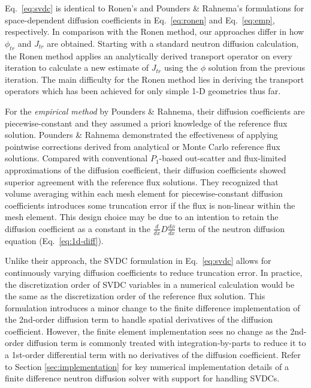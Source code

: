 Eq.\ \ref{eq:svdc} is identical to Ronen's \cite{ronen_accurate_2004} and Pounders \& Rahnema's
\cite{pounders_diffusion_2009} formulations for space-dependent diffusion coefficients in Eq.\
\ref{eq:ronen} and Eq.\ \ref{eq:emp}, respectively. In comparison with
the Ronen method, our approaches differ in how $\phi_{tr}$ and $J_{tr}$ are obtained. Starting with
a standard neutron diffusion calculation, the Ronen method applies an analytically derived
transport operator on every iteration to calculate a new estimate of $J_{tr}$ using the $\phi$
solution from the previous iteration. The main difficulty for the Ronen method lies in deriving the
transport operators which has been achieved for only simple 1-D geometries thus far.

For the \textit{empirical method} by Pounders \& Rahnema, their diffusion coefficients are
piecewise-constant and they assumed a priori knowledge of the reference flux solution.
Pounders \& Rahnema \cite{pounders_diffusion_2009} demonstrated the effectiveness of applying
pointwise corrections derived from analytical or Monte Carlo reference flux solutions. Compared
with conventional $P_1$-based out-scatter and flux-limited approximations of the diffusion
coefficient, their diffusion coefficients showed superior agreement
with the reference flux solutions. They recognized that volume averaging within each mesh element
for piecewise-constant diffusion coefficients introduces some truncation error if the flux is
non-linear within the mesh element. This design choice may be due to an intention to retain the
diffusion coefficient as a constant in the $\frac{d}{dx}D\frac{d\phi}{dx}$ term of the neutron
diffusion equation (Eq.\ \ref{eq:1d-diff}).

Unlike their approach, the \gls{SVDC} formulation in Eq.\ \ref{eq:svdc} allows for continuously
varying diffusion coefficients to reduce truncation error. In practice, the discretization order of
\gls{SVDC} variables in a numerical calculation would be the same as the discretization order of
the reference flux solution. This formulation introduces a minor change to the finite difference
implementation of the 2nd-order diffusion term to handle spatial derivatives of the
diffusion coefficient. However, the finite element implementation sees no change as the 2nd-order
diffusion term is commonly treated with integration-by-parts to reduce it to a 1st-order
differential term with no derivatives of the diffusion coefficient. Refer to Section
\ref{sec:implementation} for key numerical implementation details of a finite difference neutron
diffusion solver with support for handling \glspl{SVDC}.

